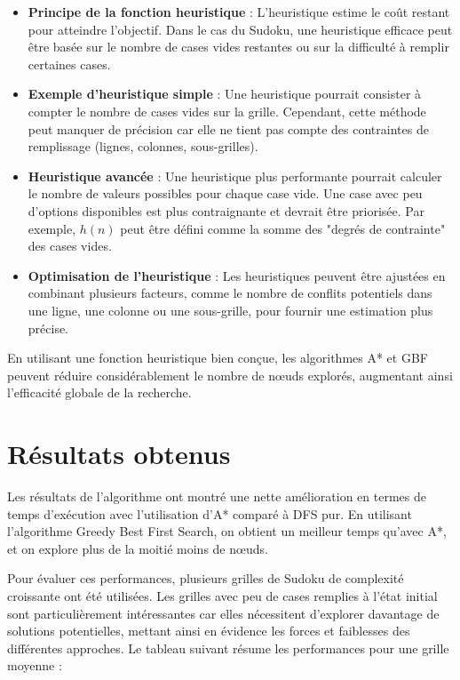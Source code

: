 \documentclass{article}
\begin{document}
\begin{itemize}
    \item \textbf{Principe de la fonction heuristique} : L'heuristique estime le coût restant pour atteindre l'objectif. Dans le cas du Sudoku, une heuristique efficace peut être basée sur le nombre de cases vides restantes ou sur la difficulté à remplir certaines cases.
    \item \textbf{Exemple d'heuristique simple} : Une heuristique pourrait consister à compter le nombre de cases vides sur la grille. Cependant, cette méthode peut manquer de précision car elle ne tient pas compte des contraintes de remplissage (lignes, colonnes, sous-grilles).
    \item \textbf{Heuristique avancée} : Une heuristique plus performante pourrait calculer le nombre de valeurs possibles pour chaque case vide. Une case avec peu d'options disponibles est plus contraignante et devrait être priorisée. Par exemple, \( h(n) \) peut être défini comme la somme des "degrés de contrainte" des cases vides.
    \item \textbf{Optimisation de l'heuristique} : Les heuristiques peuvent être ajustées en combinant plusieurs facteurs, comme le nombre de conflits potentiels dans une ligne, une colonne ou une sous-grille, pour fournir une estimation plus précise.
\end{itemize}

En utilisant une fonction heuristique bien conçue, les algorithmes A* et GBF peuvent réduire considérablement le nombre de nœuds explorés, augmentant ainsi l'efficacité globale de la recherche.

\section{Résultats obtenus}
Les résultats de l'algorithme ont montré une nette amélioration en termes de temps d'exécution avec l'utilisation d'A* comparé à DFS pur. En utilisant l'algorithme Greedy Best First Search, on obtient un meilleur temps qu'avec A*, et on explore plus de la moitié moins de nœuds.

Pour évaluer ces performances, plusieurs grilles de Sudoku de complexité croissante ont été utilisées. Les grilles avec peu de cases remplies à l'état initial sont particulièrement intéressantes car elles nécessitent d'explorer davantage de solutions potentielles, mettant ainsi en évidence les forces et faiblesses des différentes approches. Le tableau suivant résume les performances pour une grille moyenne :
\end{document}
